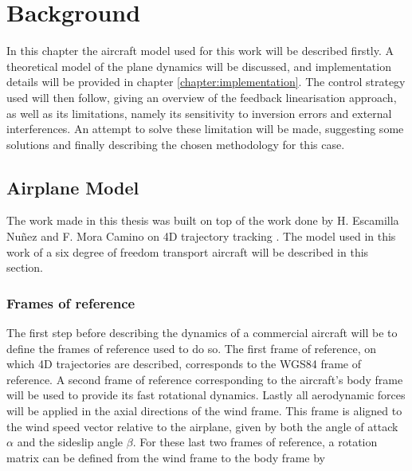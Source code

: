 
\chapter{Background}
\label{chapter:background}

In this chapter the aircraft model used for this work will be described firstly. A theoretical model of the plane dynamics will be discussed, and implementation details will be provided in chapter \ref{chapter:implementation}. The control strategy used will then follow, giving an overview of the feedback linearisation approach, as well as its limitations, namely its sensitivity to inversion errors and external interferences. An attempt to solve these limitation will be made, suggesting some solutions and finally describing the chosen methodology for this case.



\section{Airplane Model}
\label{section:background/model}

The work made in this thesis was built on top of the work done by H. Escamilla Nuñez and  F. Mora Camino on 4D trajectory tracking \cite{hector}. The model used in this work of a six degree of freedom transport aircraft will be described in this section. 

\subsection{Frames of reference}
\label{section:background/model/for}
The first step before describing the dynamics of a commercial aircraft will be to define the frames of reference used to do so. The first frame of reference, on which 4D trajectories are described, corresponds to the WGS84 frame of reference. A second frame of reference corresponding to the aircraft's body frame will be used to provide its fast rotational dynamics. Lastly all aerodynamic forces will be applied in the axial directions of the wind frame. This frame is aligned to the wind speed vector relative to the airplane, given by both the angle of attack $\alpha$ and the sideslip angle $\beta$. For these last two frames of reference, a rotation matrix can be defined from the wind frame to the body frame by


